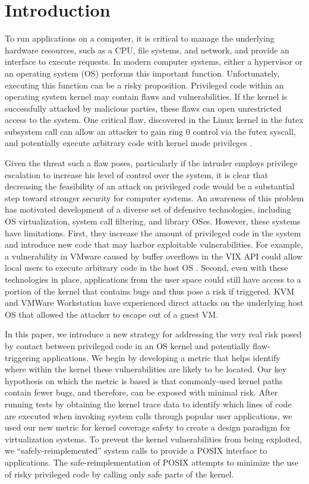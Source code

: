 \section{Introduction}
\label{sec.introduction}

To run applications on a computer, it is critical to manage the underlying hardware resources, 
such as a CPU, file systems, and network, and provide an interface to execute requests. 
In modern computer systems, either a hypervisor or an operating system (OS) 
performs this important function. Unfortunately, executing this function 
can be a risky proposition. Privileged code within an operating system kernel 
may contain flaws and vulnerabilities. If the kernel is successfully attacked by 
malicious parties, these flaws can open unrestricted access to the system. 
One critical flaw, discovered in the Linux kernel in the futex subsystem call can 
allow an attacker to gain ring 0 control via the futex syscall, and potentially 
execute arbitrary code with kernel mode privileges \cite{CVE-2014-3153}.

Given the threat such a flaw poses, particularly if the intruder employs 
privilege escalation to increase his level of control over the system, 
it is clear that decreasing the feasibility of an attack on privileged code 
would be a substantial step toward stronger security for computer systems. 
An awareness of this problem has motivated development of a diverse 
set of defensive technologies, including OS virtualization, system call filtering, 
and library OSes. However, these systems have limitations. First, they increase 
the amount of privileged code in the system and introduce new code that 
may harbor exploitable vulnerabilities. For example, a vulnerability in VMware 
caused by buffer overflows in the VIX API could allow local users to execute 
arbitrary code in the host OS \cite{CVE-2008-2100}. Second, even with these technologies in place, 
applications from the user space could still have access to a portion of the kernel 
that contains bugs and thus pose a risk if triggered. KVM \cite{KVM-Attack} and 
VMWare Workstation \cite{VMWare-Attack} have experienced direct attacks on the underlying 
host OS that allowed the attacker to escape out of a guest VM.

In this paper, we introduce a new strategy for addressing the very real risk posed by 
contact between privileged code in an OS kernel and potentially flaw-triggering applications. 
We begin by developing a metric that helps identify where within the kernel these vulnerabilities 
are likely to be located. Our key hypothesis on which the metric is based is that 
commonly-used kernel paths contain fewer bugs, and therefore, can be exposed with minimal risk. 
After running tests by obtaining the kernel trace data to identify which lines of code are executed 
when invoking system calls through popular user applications, we used our new metric for 
kernel coverage safety to create a design paradigm for virtualization systems. 
To prevent the kernel vulnerabilities from being exploited, we ``safely-reimplemented'' system calls 
to provide a POSIX interface to applications. The safe-reimplementation of POSIX attempts to 
minimize the use of risky privileged code by calling only safe parts of the kernel.

